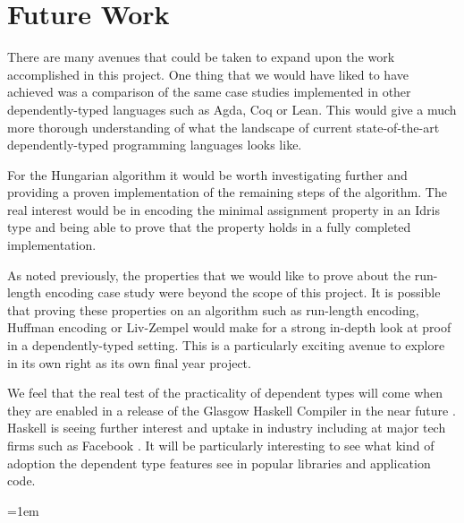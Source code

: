 \documentclass[a4paper, notitlepage]{report}
\begin{document}
\chapter{Future Work}
\label{sec:orga2331da}
There are many avenues that could be taken to expand upon the work accomplished
in this project. One thing that we would have liked to have achieved was a
comparison of the same case studies implemented in other dependently-typed
languages such as Agda, Coq or Lean. This would give a much more thorough
understanding of what the landscape of current state-of-the-art
dependently-typed programming languages looks like.

For the Hungarian algorithm it would be worth investigating further and
providing a proven implementation of the remaining steps of the algorithm. The
real interest would be in encoding the minimal assignment property in an Idris
type and being able to prove that the property holds in a fully completed
implementation.

As noted previously, the properties that we would like to prove about the
run-length encoding case study were beyond the scope of this project. It is
possible that proving these properties on an algorithm such as run-length
encoding, Huffman encoding or Liv-Zempel would make for a strong in-depth look
at proof in a dependently-typed setting. This is a particularly exciting avenue
to explore in its own right as its own final year project.

We feel that the real test of the practicality of dependent types will come when
they are enabled in a release of the Glasgow Haskell Compiler in the near future
\cite{eisenberg_dependent_2016,weirich_specif_2017}. Haskell is seeing further
interest and uptake in industry including at major tech firms such as Facebook
\cite{facebook_haxl}. It will be particularly interesting to see what kind of
adoption the dependent type features see in popular libraries and application
code.

\emergencystretch=1em
\printbibliography[heading=bibintoc, title=References]
\appendix
\end{document}
